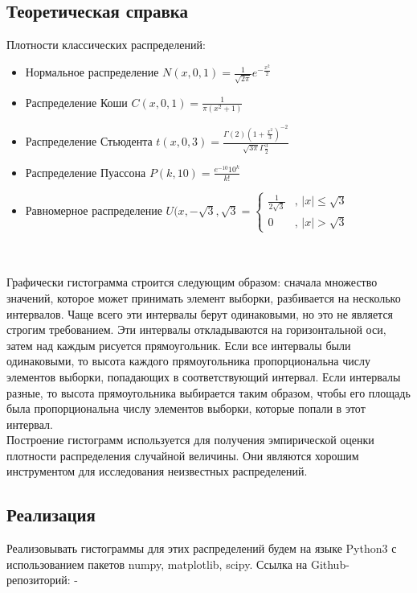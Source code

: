 \documentclass[14pt]{extarticle}
\begin{document}
\subsection{Теоретическая справка}

Плотности классических распределений:
\begin{itemize}
    \item Нормальное распределение \(N(x, 0,1)=\frac{1}{\sqrt{2\pi}}e^{-\frac{x^2}{2}}\)
    \item Распределение Коши \(C(x,0,1)=\frac{1}{\pi (x^2+1)}\)
    \item Распределение Стьюдента \(t(x,0,3)=\frac{\Gamma(2)(1+\frac{x^2}{3})^{-2}}{\sqrt{3\pi}\Gamma{\frac{3}{2}}}\)
    \item Распределение Пуассона \(P(k, 10)=\frac{e^{-10}10^k}{k!}\)
    \item Равномерное распределение \(U(x, -\sqrt{3}, \sqrt{3}=\begin{cases}
    \frac{1}{2\sqrt{3}}&\text{, } |x|\leq\sqrt{3} \\
    0&\text{, } |x|>\sqrt{3}
\end{cases}\)
\end{itemize}\\\\
Графически гистограмма строится следующим образом: сначала множество значений, которое может принимать элемент выборки, разбивается на несколько интервалов. Чаще всего эти интервалы берут одинаковыми, но это не является строгим требованием. Эти интервалы откладываются на горизонтальной оси, затем над каждым рисуется прямоугольник. Если все интервалы были одинаковыми, то высота каждого прямоугольника пропорциональна числу элементов выборки, попадающих в соответствующий интервал. Если интервалы разные, то высота прямоугольника выбирается таким образом, чтобы его площадь была пропорциональна числу элементов выборки, которые попали в этот интервал.\\
Построение гистограмм используется для получения эмпирической оценки плотности распределения случайной величины. Они являются хорошим инструментом для исследования неизвестных распределений.

\subsection{Реализация}

Реализовывать гистограммы для этих распределений будем на языке Python3 с использованием пакетов numpy, matplotlib, scipy.
Ссылка на Github-репозиторий: -
\end{document}
